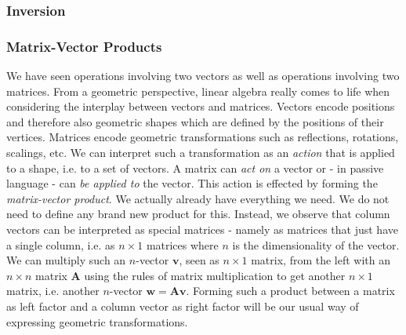 
\subsubsection{Inversion}



\subsubsection{Matrix-Vector Products}
We have seen operations involving two vectors as well as operations involving two matrices. From a geometric perspective, linear algebra really comes to life when considering the interplay between vectors and matrices. Vectors encode positions and therefore also geometric shapes which are defined by the positions of their vertices. Matrices encode geometric transformations such as reflections, rotations, scalings, etc. We can interpret such a transformation as an \emph{action} that is applied to a shape, i.e. to a set of vectors. A matrix can \emph{act on} a vector or - in passive language - can \emph{be applied to} the vector. This action is effected by forming the \emph{matrix-vector product}. We actually already have everything we need. We do not need to define any brand new product for this. Instead, we observe that column vectors can be interpreted as special matrices - namely as matrices that just have a single column, i.e. as $n \times 1$ matrices where $n$ is the dimensionality of the vector. We can multiply such an $n$-vector $\mathbf{v}$, seen as $n \times 1$ matrix, from the left with an $n \times n$ matrix  $\mathbf{A}$ using the rules of matrix multiplication to get another $n \times 1$ matrix, i.e. another $n$-vector $\mathbf{w} = \mathbf{A v}$. Forming such a product between a matrix as left factor and a column vector as right factor will be our usual way of expressing geometric transformations. 


